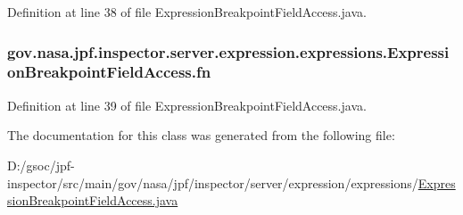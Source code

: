 Definition at line 38 of file Expression\+Breakpoint\+Field\+Access.\+java.

\subsubsection[{\texorpdfstring{fn}{fn}}]{ gov.\+nasa.\+jpf.\+inspector.\+server.\+expression.\+expressions.\+Expression\+Breakpoint\+Field\+Access.\+fn\hspace{0.3cm}{\ttfamily [private]}}\hypertarget{classgov_1_1nasa_1_1jpf_1_1inspector_1_1server_1_1expression_1_1expressions_1_1_expression_breakpoint_field_access_a09333f12f013e19c50cc328e448990fc}{}\label{classgov_1_1nasa_1_1jpf_1_1inspector_1_1server_1_1expression_1_1expressions_1_1_expression_breakpoint_field_access_a09333f12f013e19c50cc328e448990fc}


Definition at line 39 of file Expression\+Breakpoint\+Field\+Access.\+java.



The documentation for this class was generated from the following file\+:\begin{DoxyCompactItemize}
\item 
D\+:/gsoc/jpf-\/inspector/src/main/gov/nasa/jpf/inspector/server/expression/expressions/\hyperlink{_expression_breakpoint_field_access_8java}{Expression\+Breakpoint\+Field\+Access.\+java}\end{DoxyCompactItemize}
